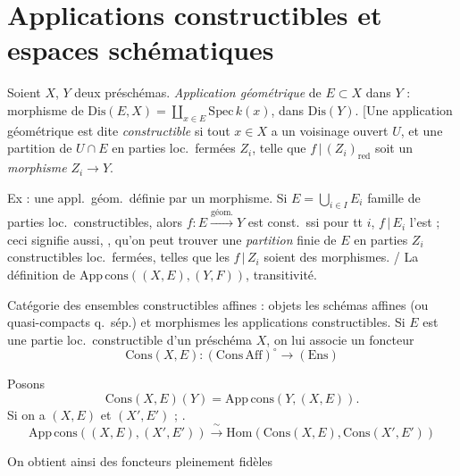 \documentclass[11pt,a4paper]{article}
\begin{document}
\section{Applications constructibles et espaces schématiques}

Soient $X$, $Y$ deux préschémas. \emph{Application géométrique} de $E\subset X$ dans $Y$ : morphisme de  $\mathrm{Dis}(E,X)=\coprod_{x\in E}\mathrm{Spec}\,k(x)$, dans $\mathrm{Dis}(Y)$. [Une application géométrique est dite \emph{constructible} si tout $x\in X$ a un voisinage  ouvert $U$, et une partition de $U\cap E$ en parties loc.\ fermées $Z_i$, telle que $f\,|\,(Z_i)_{\mathrm{red}}$ soit un \emph{morphisme} $Z_i\to Y$. 

Ex : une appl.\ géom.\ définie par un morphisme. Si $E=\bigcup_{i\in I}E_i$ famille \emph{} de parties loc.\ constructibles, alors $f:E\xrightarrow{\text{géom.}}Y$ est const.\ ssi pour tt $i$, $f\,|\,E_i$ l'est ; ceci signifie aussi, , qu'on peut trouver une \emph{partition} finie de $E$ en parties $Z_i$ constructibles loc.\ fermées, telles que les $f\,|\,Z_i$ soient des morphismes. / La définition de $\mathrm{App\,cons}((X,E),(Y,F))$, transitivité.

Catégorie des ensembles constructibles affines : objets les schémas  affines (ou quasi-compacts q.\ sép.) et morphismes les applications constructibles. Si  $E$ est une partie loc.\ constructible \struck{\ill{}} d'un préschéma $X$, on lui associe un foncteur
\[
\mathrm{Cons}(X,E) : (\mathrm{Cons\,Aff})^{\circ}\longrightarrow(\mathrm{Ens})
\]

Posons
\[
\mathrm{Cons}(X,E)(Y)=\mathrm{App\,cons}(Y,(X,E)).
\]
\struck{\ill{} \ill{}} Si on a \ill{} $(X,E)$ et $(X',E')$ ; \ill{} \ill{}.
\[
\mathrm{App\,cons}((X,E),(X',E'))\xrightarrow{\ \sim\ }\mathrm{Hom}(\mathrm{Cons}(X,E),\mathrm{Cons}(X',E'))
\]

On obtient ainsi des foncteurs pleinement fidèles

\end{document}

